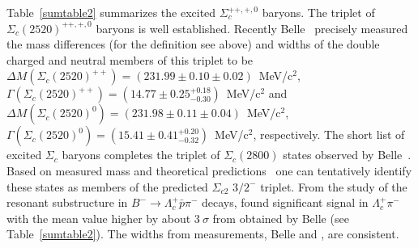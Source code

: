 \begin{table}[t]
\caption{Summary of excited $\Lambda_c^+$ baryons family.} 
\label{sumtable1} 
\end{table}


Table~\ref{sumtable2} summarizes the excited $\Sigma_c^{++,+,0}$ baryons.
The triplet of $\Sigma_c(2520)^{++,+,0}$ baryons is well established. 
Recently Belle~\cite{SHLee:2014} 
precisely measured the mass differences (for the definition see above)  
and widths of the double charged and neutral members of this triplet 
to be $\Delta M(\Sigma_c(2520)^{++})=(231.99\pm 0.10\pm 0.02)$~MeV/c$^2$, 
$\Gamma(\Sigma_c(2520)^{++})=(14.77\pm 0.25^{+0.18}_{-0.30})$~MeV/c$^2$ and 
$\Delta M(\Sigma_c(2520)^{0})=(231.98\pm 0.11\pm 0.04)$~MeV/c$^2$, 
$\Gamma(\Sigma_c(2520)^{0})=(15.41\pm 0.41^{+0.20}_{-0.32})$~MeV/c$^2$, respectively. 
The short list of excited $\Sigma_c$ baryons completes the triplet 
of $\Sigma_c(2800)$ states observed by Belle~\cite{Mizuk:2004yu}. Based 
on measured mass and theoretical predictions~\cite{Copley:1979wj,Pirjol:1997nh} 
one can tentatively identify these states as members of the predicted 
$\Sigma_{c2}$ $3/2^-$ triplet. From the study of the resonant substructure 
in $B^-\rightarrow \Lambda_c^+\bar{p}\pi^-$ decays, \babar found 
significant signal in $\Lambda_c^+\pi^-$ with the mean value 
higher by about $3~\sigma$ from obtained by Belle (see 
Table~\ref{sumtable2}). The widths from measurements, 
Belle and \babar, are consistent.


